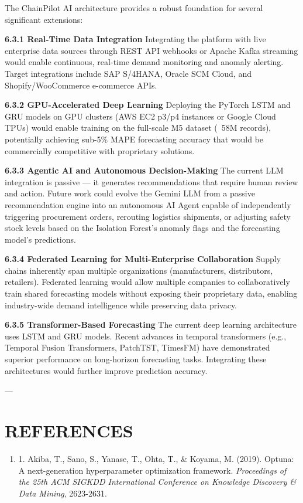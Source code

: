 \documentclass[12pt, a4paper]{report}
\begin{document}
The ChainPilot AI architecture provides a robust foundation for several significant extensions:

\textbf{6.3.1 Real-Time Data Integration}
Integrating the platform with live enterprise data sources through REST API webhooks or Apache Kafka streaming would enable continuous, real-time demand monitoring and anomaly alerting. Target integrations include SAP S/4HANA, Oracle SCM Cloud, and Shopify/WooCommerce e-commerce APIs.

\textbf{6.3.2 GPU-Accelerated Deep Learning}
Deploying the PyTorch LSTM and GRU models on GPU clusters (AWS EC2 p3/p4 instances or Google Cloud TPUs) would enable training on the full-scale M5 dataset (~58M records), potentially achieving sub-5\% MAPE forecasting accuracy that would be commercially competitive with proprietary solutions.

\textbf{6.3.3 Agentic AI and Autonomous Decision-Making}
The current LLM integration is passive — it generates recommendations that require human review and action. Future work could evolve the Gemini LLM from a passive recommendation engine into an autonomous AI Agent capable of independently triggering procurement orders, rerouting logistics shipments, or adjusting safety stock levels based on the Isolation Forest's anomaly flags and the forecasting model's predictions.

\textbf{6.3.4 Federated Learning for Multi-Enterprise Collaboration}
Supply chains inherently span multiple organizations (manufacturers, distributors, retailers). Federated learning would allow multiple companies to collaboratively train shared forecasting models without exposing their proprietary data, enabling industry-wide demand intelligence while preserving data privacy.

\textbf{6.3.5 Transformer-Based Forecasting}
The current deep learning architecture uses LSTM and GRU models. Recent advances in temporal transformers (e.g., Temporal Fusion Transformers, PatchTST, TimesFM) have demonstrated superior performance on long-horizon forecasting tasks. Integrating these architectures would further improve prediction accuracy.

---

\section{REFERENCES}

\begin{enumerate}
\item 1. Akiba, T., Sano, S., Yanase, T., Ohta, T., \& Koyama, M. (2019). Optuna: A next-generation hyperparameter optimization framework. \textit{Proceedings of the 25th ACM SIGKDD International Conference on Knowledge Discovery \& Data Mining}, 2623-2631.
\end{enumerate}
\end{document}
